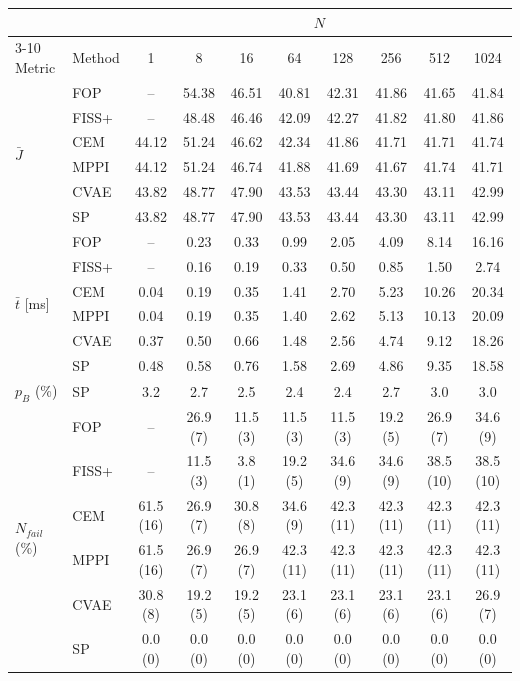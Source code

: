 \begin{tabular}{llcccccccc}
\toprule
& & \multicolumn{8}{c}{$N$} \\
\cmidrule(lr){3-10}
Metric & Method & 1 & 8 & 16 & 64 & 128 & 256 & 512 & 1024 \\
\midrule
\multirow{6}{*}{$\bar{J}$} & FOP & -- & 54.38 & 46.51 & 40.81 & 42.31 & 41.86 & 41.65 & 41.84 \\
 & FISS+ & -- & 48.48 & 46.46 & 42.09 & 42.27 & 41.82 & 41.80 & 41.86 \\
 & CEM & 44.12 & 51.24 & 46.62 & 42.34 & 41.86 & 41.71 & 41.71 & 41.74 \\
 & MPPI & 44.12 & 51.24 & 46.74 & 41.88 & 41.69 & 41.67 & 41.74 & 41.71 \\
 & CVAE & 43.82 & 48.77 & 47.90 & 43.53 & 43.44 & 43.30 & 43.11 & 42.99 \\
 & SP & 43.82 & 48.77 & 47.90 & 43.53 & 43.44 & 43.30 & 43.11 & 42.99 \\
\midrule
\multirow{6}{*}{$\bar{t}$ [ms]} & FOP & -- & 0.23 & 0.33 & 0.99 & 2.05 & 4.09 & 8.14 & 16.16 \\
 & FISS+ & -- & 0.16 & 0.19 & 0.33 & 0.50 & 0.85 & 1.50 & 2.74 \\
 & CEM & 0.04 & 0.19 & 0.35 & 1.41 & 2.70 & 5.23 & 10.26 & 20.34 \\
 & MPPI & 0.04 & 0.19 & 0.35 & 1.40 & 2.62 & 5.13 & 10.13 & 20.09 \\
 & CVAE & 0.37 & 0.50 & 0.66 & 1.48 & 2.56 & 4.74 & 9.12 & 18.26 \\
 & SP & 0.48 & 0.58 & 0.76 & 1.58 & 2.69 & 4.86 & 9.35 & 18.58 \\
\midrule
\multirow{1}{*}{$p_{B}$ (\%)} & SP & 3.2 & 2.7 & 2.5 & 2.4 & 2.4 & 2.7 & 3.0 & 3.0 \\
\midrule
\multirow{6}{*}{$N_{fail}$ (\%)} & FOP & -- & 26.9 (7) & 11.5 (3) & 11.5 (3) & 11.5 (3) & 19.2 (5) & 26.9 (7) & 34.6 (9) \\
 & FISS+ & -- & 11.5 (3) & 3.8 (1) & 19.2 (5) & 34.6 (9) & 34.6 (9) & 38.5 (10) & 38.5 (10) \\
 & CEM & 61.5 (16) & 26.9 (7) & 30.8 (8) & 34.6 (9) & 42.3 (11) & 42.3 (11) & 42.3 (11) & 42.3 (11) \\
 & MPPI & 61.5 (16) & 26.9 (7) & 26.9 (7) & 42.3 (11) & 42.3 (11) & 42.3 (11) & 42.3 (11) & 42.3 (11) \\
 & CVAE & 30.8 (8) & 19.2 (5) & 19.2 (5) & 23.1 (6) & 23.1 (6) & 23.1 (6) & 23.1 (6) & 26.9 (7) \\
 & SP & 0.0 (0) & 0.0 (0) & 0.0 (0) & 0.0 (0) & 0.0 (0) & 0.0 (0) & 0.0 (0) & 0.0 (0) \\
\bottomrule
\end{tabular}
